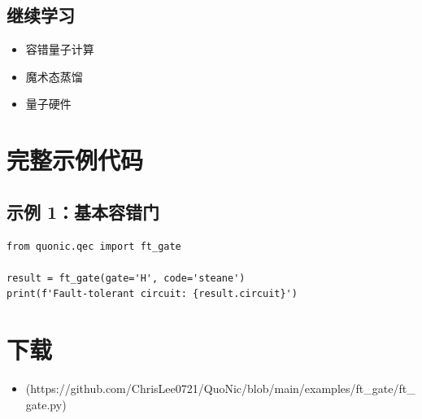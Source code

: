 \documentclass[12pt,a4paper]{article}
\begin{document}
\subsection{继续学习}
\begin{itemize}
  \item 容错量子计算
  \item 魔术态蒸馏
  \item 量子硬件
\end{itemize}

\section{完整示例代码}

\subsection{示例 1：基本容错门}

\begin{verbatim}
from quonic.qec import ft_gate

result = ft_gate(gate='H', code='steane')
print(f'Fault-tolerant circuit: {result.circuit}')
\end{verbatim}

\section{下载}

\begin{itemize}
  \item [ft\_gate.py](https://github.com/ChrisLee0721/QuoNic/blob/main/examples/ft_gate/ft_gate.py)
\end{itemize}
\end{document}
